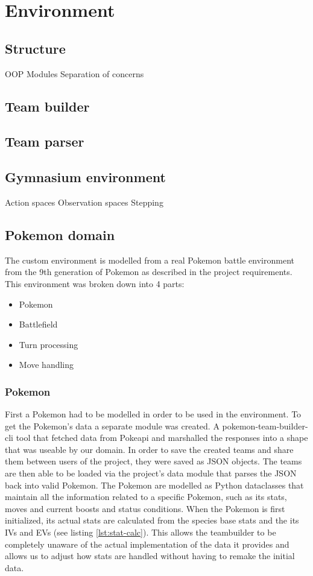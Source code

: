 \section{Environment}
\label{sec:environment}

\subsection{Structure}
OOP
Modules
Separation of concerns

\subsection{Team builder}

\subsection{Team parser}

\subsection{Gymnasium environment}
Action spaces
Observation spaces
Stepping

\subsection{Pokemon domain}
The custom environment is modelled from a real Pokemon battle environment from the 9th generation of Pokemon as described in the project requirements.
This environment was broken down into 4 parts:
\begin{itemize}
    \item Pokemon
    \item Battlefield
    \item Turn processing
    \item Move handling
\end{itemize}

\subsubsection{Pokemon}
First a Pokemon had to be modelled in order to be used in the environment.
To get the Pokemon's data a separate module was created. A pokemon-team-builder-cli \cite{TeambuilderCli} tool that
fetched data from Pokeapi \cite{PokeAPI} and marshalled the responses into a shape that was useable by our domain.
In order to save the created teams and share them between users of the project, they were saved as JSON objects.
The teams are then able to be loaded via the project's data module that parses the JSON back into valid Pokemon.
The Pokemon are modelled as Python dataclasses that maintain all the information related to a specific Pokemon, such as
its stats, moves and current boosts and status conditions. When the Pokemon is first initialized, its actual stats
are calculated from the species base stats and the its IVs and EVs (see listing \ref{lst:stat-calc}). This allows the teambuilder to be
completely unaware of the actual implementation of the data it provides and allows us to adjust how stats are handled
without having to remake the initial data.

